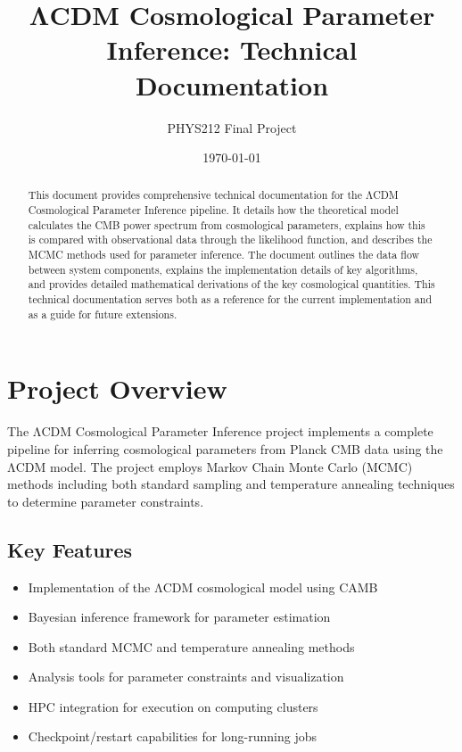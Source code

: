 \documentclass[11pt]{article}
\title{\LARGE \textbf{ΛCDM Cosmological Parameter Inference: Technical Documentation}}
\author{PHYS212 Final Project}
\date{\today}
\begin{document}
\maketitle

\begin{abstract}
    This document provides comprehensive technical documentation for the ΛCDM Cosmological Parameter Inference pipeline. It details how the theoretical model calculates the CMB power spectrum from cosmological parameters, explains how this is compared with observational data through the likelihood function, and describes the MCMC methods used for parameter inference. The document outlines the data flow between system components, explains the implementation details of key algorithms, and provides detailed mathematical derivations of the key cosmological quantities. This technical documentation serves both as a reference for the current implementation and as a guide for future extensions.
\end{abstract}

\tableofcontents

\newpage

\section{Project Overview}

The ΛCDM Cosmological Parameter Inference project implements a complete pipeline for inferring cosmological parameters from Planck CMB data using the ΛCDM model. The project employs Markov Chain Monte Carlo (MCMC) methods including both standard sampling and temperature annealing techniques to determine parameter constraints.

\subsection{Key Features}

\begin{itemize}
    \item Implementation of the ΛCDM cosmological model using CAMB
    \item Bayesian inference framework for parameter estimation
    \item Both standard MCMC and temperature annealing methods
    \item Analysis tools for parameter constraints and visualization
    \item HPC integration for execution on computing clusters
    \item Checkpoint/restart capabilities for long-running jobs
\end{itemize}
\end{document}
